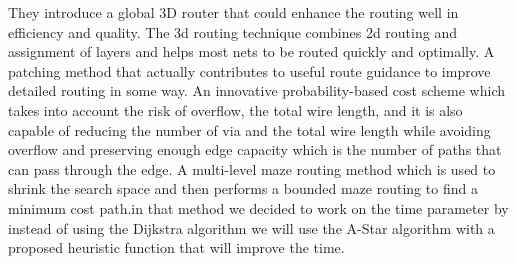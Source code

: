 \documentclass[conference]{IEEEtran}
\begin{document}
They introduce a global 3D router that could enhance the routing well in efficiency and quality. The 3d routing technique combines 2d routing and assignment of layers and helps most nets to be routed quickly and optimally. A patching method that actually contributes to useful route guidance to improve detailed routing in some way. An innovative probability-based cost scheme which takes into account the risk of overflow, the total wire length, and it is also capable of reducing the number of via and the total wire length while avoiding overflow and preserving enough edge capacity which is the number of paths that can pass through the edge. A multi-level maze routing method which is used to shrink the search space and then performs a bounded maze routing to find a minimum cost path.in that method we decided to work on the time parameter by instead of using the Dijkstra algorithm we will use the A-Star algorithm with a proposed heuristic function that will improve the time.

\end{document}
